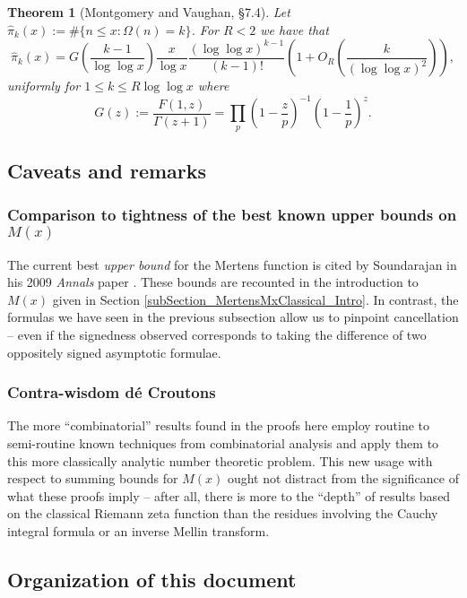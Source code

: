\documentclass[11pt,reqno,a4letter]{article}
\numberwithin{figure}{section}
\numberwithin{table}{section}
\theoremstyle{plain}
\newtheorem{theorem}{Theorem}
\numberwithin{theorem}{section}
\theoremstyle{definition}
\begin{document}
\begin{theorem}[Montgomery and Vaughan, \S 7.4]
\label{theorem_HatPi_ExtInTermsOfGz} 
Let $\widehat{\pi}_k(x) := \#\{n \leq x: \Omega(n)=k\}$. For $R < 2$ we have that 
\[
\widehat{\pi}_k(x) = G\left(\frac{k-1}{\log\log x}\right) \frac{x}{\log x} 
     \frac{(\log\log x)^{k-1}}{(k-1)!} \left(1 + O_R\left(\frac{k}{(\log\log x)^2}\right)\right),  
\]
uniformly for $1 \leq k \leq R \log\log x$ where 
\[
G(z) := \frac{F(1, z)}{\Gamma(z+1)} = \prod_p \left(1-\frac{z}{p}\right)^{-1} \left(1-\frac{1}{p}\right)^z. 
\]
\end{theorem} 



\subsection{Caveats and remarks} 

\subsubsection{Comparison to tightness of the best known upper bounds on $M(x)$} 

The current best 
\emph{upper bound} for the Mertens function is cited by Soundarajan in his 2009 \emph{Annals} paper 
\cite{SOUND-MERTENS-ANNALS}. These bounds are recounted in the introduction to $M(x)$ given in 
Section \ref{subSection_MertensMxClassical_Intro}. 
In contrast, the formulas we have seen in the previous subsection allow us to pinpoint cancellation -- 
even if the signedness observed corresponds to taking the difference of two oppositely signed 
asymptotic formulae. 

\subsubsection{Contra-wisdom d\'{e} Croutons} 

The more ``combinatorial'' results found in the proofs here employ routine to semi-routine known 
techniques from combinatorial analysis and apply them to this more classically analytic number theoretic 
problem. This new usage with respect to summing bounds for $M(x)$ ought not distract from the significance 
of what these proofs imply -- after all, there is more to the ``depth'' of results based on the classical 
Riemann zeta function than the residues involving the Cauchy integral formula or an inverse Mellin transform. 


\subsection{Organization of this document} 
\end{document}
